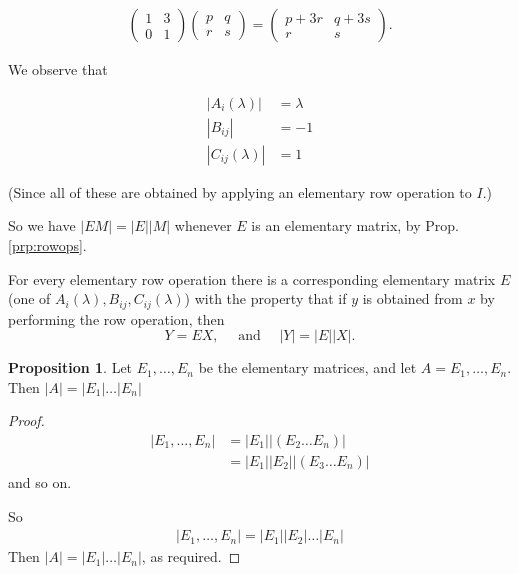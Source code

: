 \documentclass{article}
\theoremstyle{definition} \newtheorem*{definition}{Definition}
\newtheorem{proposition}[theorem]{Proposition}
\newcommand{\Det}[1]{|#1|}
\begin{document}
\begin{exmps}
  \begin{align*}
  \left( 
  \begin{matrix}
    1 & 3 \\
    0 & 1
  \end{matrix}
  \right)\left( 
  \begin{matrix}
    p & q \\
    r & s
  \end{matrix}
  \right) = \left( 
  \begin{matrix}
    p + 3r & q + 3s \\
    r & s
  \end{matrix}
  \right).
\end{align*}

We observe that

\begin{align*}
  \Det{A_i(\lambda)} &= \lambda \\
    \Det{B_{ij}} &= -1\\
    \Det{C_{ij}(\lambda)} &= 1
\end{align*}

(Since all of these are obtained by applying an elementary row operation to $I$.)

So we have $\Det{EM}=\Det{E}\Det{M}$ whenever $E$ is an elementary matrix,
by Prop. \ref{prp:rowops}.
\end{exmps}

For every elementary row operation there is a corresponding elementary matrix $E$ (one of $A_i(\lambda),B_{ij},C_{ij}(\lambda)$) with the property that if $y$ is obtained from $x$ by performing the row operation, then 
\[
  Y = EX,\quad \text{ and } \quad \Det{Y} = \Det{E}\Det{X}.
\]

\begin{proposition}
  \label{prp:elemprod}
  Let $E_1,\dots,E_n$ be the elementary matrices, and let 
  $A=E_1,\dots,E_n$. Then $\Det{A}=\Det{E_1}\dots\Det{E_n}$
\end{proposition}

  \begin{proof}
    \begin{align*}
      \Det{E_1,\dots,E_n} &= \Det{E_1}\Det{\left( E_2 \dots E_n \right)}\\
      &= \Det{E_1}\Det{E_2}\Det{\left( E_3 \dots E_n \right)}
    \end{align*}
    and so on.

    So
    \begin{align*}
      \Det{E_1,\dots,E_n} = \Det{E_1}\Det{E_2}\dots\Det{E_n}
    \end{align*}
  Then $\Det{A}=\Det{E_1}\dots\Det{E_n}$, as required.
  \end{proof}
\end{document}
